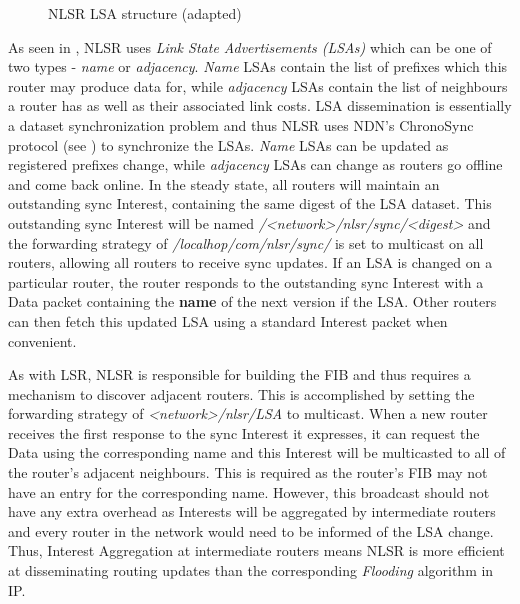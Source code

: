 \begin{figure}[H]
    \centering
    \caption{NLSR LSA structure \cite{nlsr} (adapted)}
    \label{fig:nlsr-lsa}
\end{figure}

As seen in , NLSR uses \textit{Link State Advertisements (LSAs)} which can be one of two types - \textit{name} or \textit{adjacency}. \textit{Name} LSAs contain the list of prefixes which this router may produce data for, while \textit{adjacency} LSAs contain the list of neighbours a router has as well as their associated link costs. LSA dissemination is essentially a dataset synchronization problem and thus NLSR uses NDN's ChronoSync protocol (see ) to synchronize the LSAs. \textit{Name} LSAs can be updated as registered prefixes change, while \textit{adjacency} LSAs can change as routers go offline and come back online. In the steady state, all routers will maintain an outstanding sync Interest, containing the same digest of the LSA dataset. This outstanding sync Interest will be named \textit{/<network>/nlsr/sync/<digest>} and the forwarding strategy of \textit{/localhop/com/nlsr/sync/} is set to multicast on all routers, allowing all routers to receive sync updates. If an LSA is changed on a particular router, the router responds to the outstanding sync Interest with a Data packet containing the \textbf{name} of the next version if the LSA. Other routers can then fetch this updated LSA using a standard Interest packet when convenient.  

As with LSR, NLSR is responsible for building the FIB and thus requires a mechanism to discover adjacent routers. This is accomplished by setting the forwarding strategy of \textit{<network>/nlsr/LSA} to multicast. When a new router receives the first response to the sync Interest it expresses, it can request the Data using the corresponding name and this Interest will be multicasted to all of the router's adjacent neighbours. This is required as the router's FIB may not have an entry for the corresponding name. However, this broadcast should not have any extra overhead as Interests will be aggregated by intermediate routers and every router in the network would need to be informed of the LSA change. Thus, Interest Aggregation at intermediate routers means NLSR is more efficient at disseminating routing updates than the corresponding \textit{Flooding} algorithm in IP.


